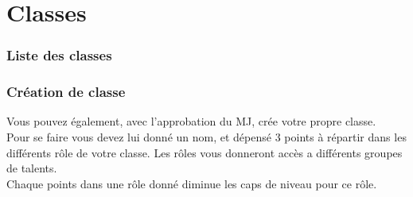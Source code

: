 \part{Classes}

\section{Liste des classes}

\section{Création de classe}
Vous pouvez également, avec l'approbation du MJ, crée votre propre classe. \\
Pour se faire vous devez lui donné un nom, et dépensé 3 %
points à répartir dans les différents rôle de votre classe. Les rôles vous donneront accès a différents groupes de talents. \\
Chaque points dans une rôle donné diminue les caps de niveau pour ce rôle. 